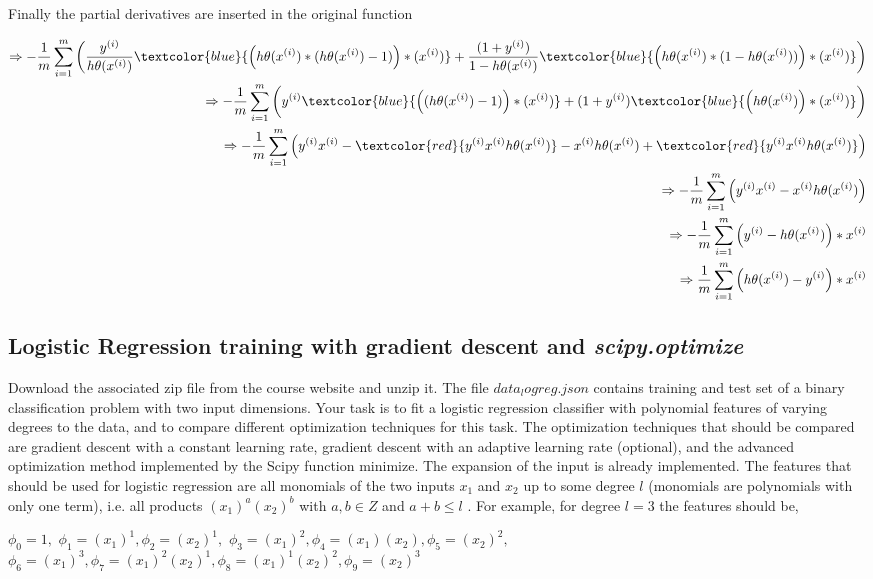 \documentclass[a4paper]{article}
\begin{document}
Finally the partial derivatives are inserted in the original function

\begin{align}
\Rightarrow -\frac{1}{m} \sum_{i=1}^{m} \bigg(\frac{y^{(i)}}{h\theta(x^{(i)})} \textcolor{blue}{\Big(h\theta(x^{(i)}) * (h\theta(x^{(i)}) - 1)\Big) * (x^{(i)})} + \frac{(1 + y^{(i)})}{1 - h\theta(x^{(i)})} \textcolor{blue}{\Big(h\theta(x^{(i)}) * (1 - h\theta(x^{(i)}))\Big) * (x^{(i)})}\bigg) \\
\Rightarrow -\frac{1}{m} \sum_{i=1}^{m} \bigg(y^{(i)} \textcolor{blue}{\Big((h\theta(x^{(i)}) - 1)\Big) * (x^{(i)})} + (1 + y^{(i)}) \textcolor{blue}{\Big(h\theta(x^{(i)})\Big) * (x^{(i)})}\bigg) \\
\Rightarrow -\frac{1}{m} \sum_{i=1}^{m} \Big(y^{(i)}x^{(i)} - \textcolor{red}{y^{(i)}x^{(i)}h\theta(x^{(i)})} - x^{(i)}h\theta(x^{(i)}) + \textcolor{red}{y^{(i)}x^{(i)}h\theta(x^{(i)})}\Big) \\
\Rightarrow -\frac{1}{m} \sum_{i=1}^{m} \Big(y^{(i)}x^{(i)} - x^{(i)}h\theta(x^{(i)})\Big) \\
\Rightarrow -\frac{1}{m} \sum_{i=1}^{m} \Big(y^{(i)} - h\theta(x^{(i)}) \Big) * x^{(i)} \\
\Rightarrow \frac{1}{m} \sum_{i=1}^{m} \Big(h\theta(x^{(i)}) - y^{(i)}\Big) * x^{(i)}
\end{align}

\subsection{Logistic Regression training with gradient descent and\textit{ scipy.optimize}}
Download the associated zip file from the course website and unzip it. The file $data_logreg.json$ contains
training and test set of a binary classification problem with two input dimensions. Your task is to fit a
logistic regression classifier with polynomial features of varying degrees to the data, and to compare different
optimization techniques for this task. The optimization techniques that should be compared are gradient
descent with a constant learning rate, gradient descent with an adaptive learning rate (optional), and the
advanced optimization method implemented by the Scipy function minimize. The expansion of the input is
already implemented. The features that should be used for logistic regression are all monomials of the two
inputs $x_1$ and $x_2$ up to some degree $l$ (monomials are polynomials with only one term), i.e. all products
$(x_1)^a(x_2)^b$ with $a, b \in {Z}$ and $ a+ b \leq l$ . For example, for degree $l=3 $ the features should be,
\begin{center}
$\phi_0 = 1,$
$\phi_1=(x_1)^1, \phi_2=(x_2)^1,$
$\phi_3=(x_1)^2, \phi_4=(x_1)(x_2),\phi_5=(x_2)^2,$
$\phi_6=(x_1)^3,\phi_7=(x_1)^2(x_2)^1,\phi_8=(x_1)^1(x_2)^2,\phi_9=(x_2)^3$
\end{center}
\end{document}
